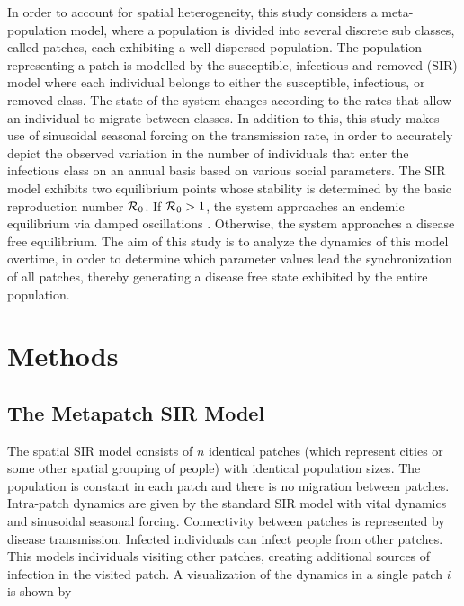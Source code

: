 \documentclass[twocolumn,nofootinbib,showkeys,twoside,floatfix,unsortedaddress,flushbottom,10pt,aps,pra]{report}
\begin{document}
In order to account for spatial heterogeneity, this study considers a meta-population model, where a population is divided into several discrete sub classes, called patches, each exhibiting a well dispersed population. The population representing a patch is modelled by the susceptible, infectious and removed (SIR) model where each individual belongs to either the susceptible, infectious, or removed class. The state of the system changes according to the rates that allow an individual to migrate between classes. In addition to this, this study makes use of sinusoidal seasonal forcing on the transmission rate, in order to accurately depict the observed variation in the number of individuals that enter the infectious class on an annual basis based on various social parameters. The SIR model exhibits two equilibrium points whose stability is determined by the basic reproduction number ${\cal R}_0$. If  ${\cal R}_0 > 1$, the system approaches an endemic equilibrium via damped oscillations \cite{Lloyd1996}. Otherwise, the system approaches a disease free equilibrium. The aim of this study is to analyze the dynamics of this model overtime, in order to determine which parameter values lead the synchronization of all patches, thereby generating a disease free state exhibited by the entire population. \par

\section{Methods}
\subsection{The Metapatch SIR Model} 
The spatial SIR model consists of $n$ identical patches (which represent cities or some other spatial grouping of people) with identical population sizes. The population is constant in each patch and there is no migration between patches. Intra-patch dynamics are given by the standard SIR model with vital dynamics and sinusoidal seasonal forcing. Connectivity between patches is represented by disease transmission. Infected individuals can infect people from other patches. This models individuals visiting other patches, creating additional sources of infection in the visited patch. 
A visualization of the dynamics in a single patch $i$ is shown by
\begin{center}
\end{center}
\end{document}
